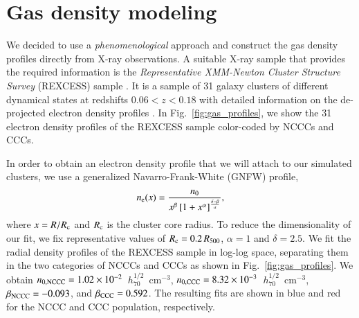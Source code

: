 \documentclass[useAMS,usenatbib]{mn2e}
\begin{document}
\section{Gas density modeling}
\label{sec:3}

We decided to use a \emph{phenomenological} approach and construct the gas
density profiles directly from X-ray observations. A suitable X-ray sample that
provides the required information is the \emph{Representative XMM-Newton Cluster
  Structure Survey} (REXCESS) sample \citep{2008A&A...487..431C,
  2009A&A...498..361P}. It is a sample of 31 galaxy clusters of different
dynamical states at redshifts $0.06<z<0.18$ with detailed information on the
de-projected electron density profiles \citep{2008A&A...487..431C}. In
Fig.~\ref{fig:gas_profiles}, we show the 31 electron density profiles of the
REXCESS sample color-coded by NCCCs and CCCs.

In order to obtain an electron density profile that we will attach to our
simulated clusters, we use a generalized Navarro-Frank-White (GNFW) profile,
\begin{equation}
n_{{\mathrm{e}}}(x) = \frac{n_{0}}{x^{\beta}\left[1+x^{\alpha}\right]^{\frac{\delta-\beta}{\alpha}}},
\label{eq:gnfw}
\end{equation}
where $x=R/R_{{\mathrm{c}}}$ and $R_{{\mathrm{c}}}$ is the cluster core radius. To reduce
the dimensionality of our fit, we fix representative values of $R_{{\mathrm{c}}} =
0.2\, R_{500}$, $\alpha = 1$ and $\delta = 2.5$. We fit the radial density
profiles of the REXCESS sample in log-log space, separating them in the two
categories of NCCCs and CCCs as shown in Fig.~\ref{fig:gas_profiles}.  We obtain
$n_{{\mathrm{0,NCCC}}} = 1.02\times10^{-2}$~$h_{70}^{1/2}$~cm$^{-3}$,
$n_{{\mathrm{0,CCC}}} = 8.32\times10^{-3}$~$h_{70}^{1/2}$~cm$^{-3}$,
$\beta_{{\mathrm{NCCC}}} = -0.093$, and $\beta_{{\mathrm{CCC}}} = 0.592$. The resulting
fits are shown in blue and red for the NCCC and CCC population,
respectively.
\end{document}

